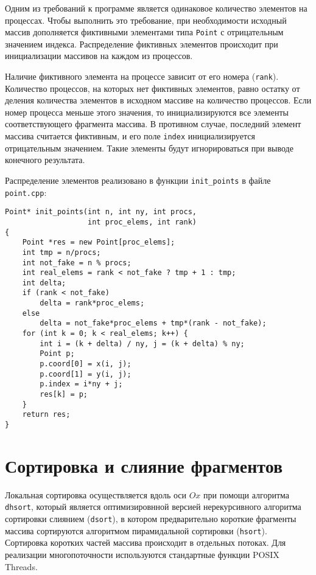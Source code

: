 \documentclass[oneside,final,14pt]{extreport}
\begin{document}
Одним из требований к программе является одинаковое количество элементов
на процессах. Чтобы выполнить это требование, при необходимости
исходный массив дополняется фиктивными элементами типа \texttt{Point} с
отрицательным значением индекса. Распределение фиктивных элементов происходит
при инициализации массивов на каждом из процессов.

Наличие фиктивного элемента на процессе зависит от его номера (\texttt{rank}).
Количество процессов, на которых нет фиктивных элементов, равно остатку от
деления количества элементов в исходном массиве на количество процессов.
Если номер процесса меньше этого значения, то инициализируются все элементы
соответствующего фрагмента массива. В противном случае, последний элемент
массива считается фиктивным, и его поле \texttt{index} инициализируется
отрицательным значением. Такие элементы будут игнорироваться при выводе
конечного результата.

Распределение элементов реализовано в функции \texttt{init\_points} в
файле \texttt{point.cpp}:

\begin{verbatim}
Point* init_points(int n, int ny, int procs,
                   int proc_elems, int rank)
{
    Point *res = new Point[proc_elems];
    int tmp = n/procs;
    int not_fake = n % procs;
    int real_elems = rank < not_fake ? tmp + 1 : tmp;
    int delta;
    if (rank < not_fake)
        delta = rank*proc_elems;
    else
        delta = not_fake*proc_elems + tmp*(rank - not_fake);
    for (int k = 0; k < real_elems; k++) {
        int i = (k + delta) / ny, j = (k + delta) % ny;
        Point p;
        p.coord[0] = x(i, j);
        p.coord[1] = y(i, j);
        p.index = i*ny + j;
        res[k] = p;
    }
    return res;
}
\end{verbatim}

\section*{Сортировка и слияние фрагментов}

Локальная сортировка осуществляется вдоль оси $Ox$ при помощи алгоритма \texttt{dhsort},
который является оптимизировнной версией нерекурсивного алгоритма сортировки
слиянием (\texttt{dsort}), в котором предварительно короткие фрагменты
массива сортируются алгоритмом пирамидальной сортировки (\texttt{hsort}).
Сортировка коротких частей массива происходит в отдельных потоках.
Для реализации многопоточности используются стандартные функции
POSIX Threads.
\end{document}
